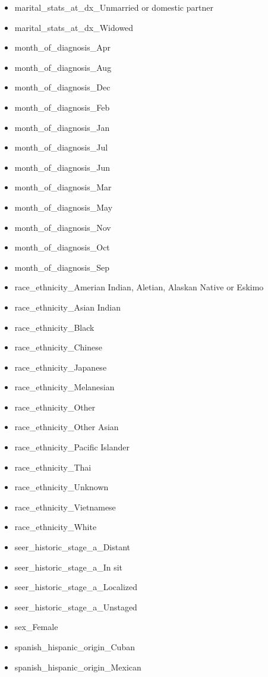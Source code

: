 \documentclass[10pt,letterpaper]{article}
\begin{document}
\begin{itemize}[noitemsep]
\item marital\_stats\_at\_dx\_Unmarried or domestic partner
\item marital\_stats\_at\_dx\_Widowed
\item month\_of\_diagnosis\_Apr
\item month\_of\_diagnosis\_Aug
\item month\_of\_diagnosis\_Dec
\item month\_of\_diagnosis\_Feb
\item month\_of\_diagnosis\_Jan
\item month\_of\_diagnosis\_Jul
\item month\_of\_diagnosis\_Jun
\item month\_of\_diagnosis\_Mar
\item month\_of\_diagnosis\_May
\item month\_of\_diagnosis\_Nov
\item month\_of\_diagnosis\_Oct
\item month\_of\_diagnosis\_Sep
\item race\_ethnicity\_Amerian Indian, Aletian, Alaskan Native or Eskimo
\item race\_ethnicity\_Asian Indian
\item race\_ethnicity\_Black
\item race\_ethnicity\_Chinese
\item race\_ethnicity\_Japanese
\item race\_ethnicity\_Melanesian
\item race\_ethnicity\_Other
\item race\_ethnicity\_Other Asian
\item race\_ethnicity\_Pacific Islander
\item race\_ethnicity\_Thai
\item race\_ethnicity\_Unknown
\item race\_ethnicity\_Vietnamese
\item race\_ethnicity\_White
\item seer\_historic\_stage\_a\_Distant
\item seer\_historic\_stage\_a\_In sit
\item seer\_historic\_stage\_a\_Localized
\item seer\_historic\_stage\_a\_Unstaged
\item sex\_Female
\item spanish\_hispanic\_origin\_Cuban
\item spanish\_hispanic\_origin\_Mexican

\end{itemize}
\end{document}
